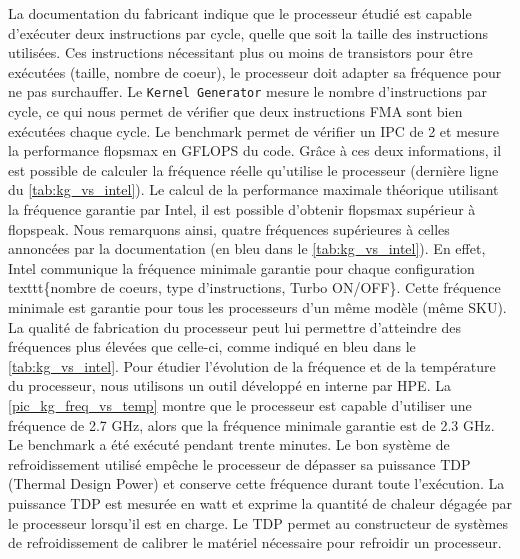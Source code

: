     

    
    La documentation du fabricant indique que le processeur étudié est capable d'exécuter deux instructions par cycle, quelle que soit la taille des instructions utilisées. Ces instructions nécessitant plus ou moins de transistors pour être exécutées (taille, nombre de coeur), le processeur doit adapter sa fréquence pour ne pas surchauffer.  Le \verb=Kernel Generator= mesure le nombre d'instructions par cycle, ce qui nous permet de vérifier que deux instructions \gls{FMA} sont bien exécutées chaque cycle. Le benchmark permet de vérifier un \gls{IPC} de 2 et mesure la performance \gls{flopsmax} en GFLOPS du code. Grâce à ces deux informations, il est possible de calculer la fréquence réelle qu'utilise le processeur (dernière ligne du  \autoref{tab:kg_vs_intel}). Le calcul de la performance maximale théorique utilisant la fréquence garantie par Intel, il est possible d'obtenir \gls{flopsmax} supérieur à \gls{flopspeak}. Nous remarquons ainsi, quatre fréquences supérieures à celles annoncées par la documentation (en bleu dans le \autoref{tab:kg_vs_intel}). En effet, Intel communique la fréquence minimale garantie pour chaque configuration texttt{\{nombre de coeurs, type d'instructions, Turbo ON/OFF\}}. Cette fréquence minimale est garantie pour tous les processeurs d'un même modèle (même SKU). La qualité de fabrication du processeur peut lui permettre d'atteindre des fréquences plus élevées que celle-ci, comme indiqué en bleu dans le \autoref{tab:kg_vs_intel}. Pour étudier l'évolution de la fréquence et de la température du processeur, nous utilisons un outil développé en interne par HPE. La \autoref{pic_kg_freq_vs_temp} montre que le processeur est capable d'utiliser une fréquence de 2.7 GHz, alors que la fréquence minimale garantie est de 2.3 GHz. Le benchmark a été exécuté pendant trente minutes. Le bon système de refroidissement utilisé empêche le processeur de dépasser sa puissance TDP (Thermal Design Power) et conserve cette fréquence durant toute l'exécution. La puissance TDP est mesurée en watt et exprime la quantité de chaleur dégagée par le processeur lorsqu'il est en charge. Le TDP permet au constructeur de systèmes de refroidissement de calibrer le matériel nécessaire pour refroidir un processeur.  
    
